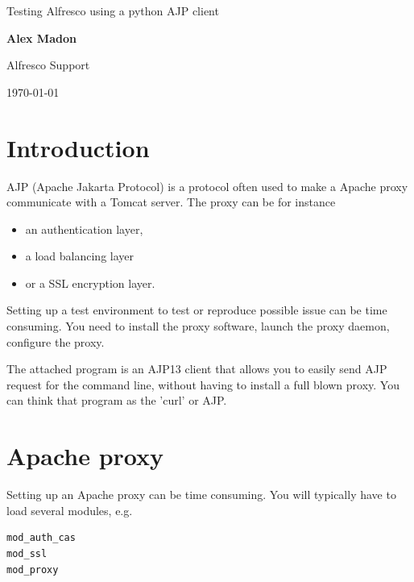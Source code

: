 \documentclass[12pt,a4]{article}
\begin{document}
\begin{center}
{\huge Testing Alfresco using a python AJP client}

\vspace{5mm}


\vspace{25mm}

{\bf Alex Madon}

\vspace{5mm}

Alfresco Support

\vspace{5mm}

\today

\vspace{15mm}

\end{center}
\vspace{5mm}

\newpage

\tableofcontents

\newpage

\section{Introduction}
AJP (Apache Jakarta Protocol) is a protocol often used to make a Apache proxy communicate with a Tomcat server.
The proxy can be for instance 
\begin{itemize}
\item an authentication layer, 
\item a load balancing layer 
\item or a SSL encryption layer.
\end{itemize}

Setting up a test environment to test or reproduce possible issue can be time consuming. You need to install the proxy software, launch the proxy daemon, configure the proxy.

The attached program is an AJP13 client that allows you to easily send AJP request for the command line, without having to install a full blown proxy. You can think that program as the 'curl' or AJP.


\section{Apache proxy}
Setting up an Apache proxy can be time consuming.
You will typically have to load several modules, e.g.
\begin{verbatim}
mod_auth_cas
mod_ssl
mod_proxy
\end{verbatim}
\end{document}
